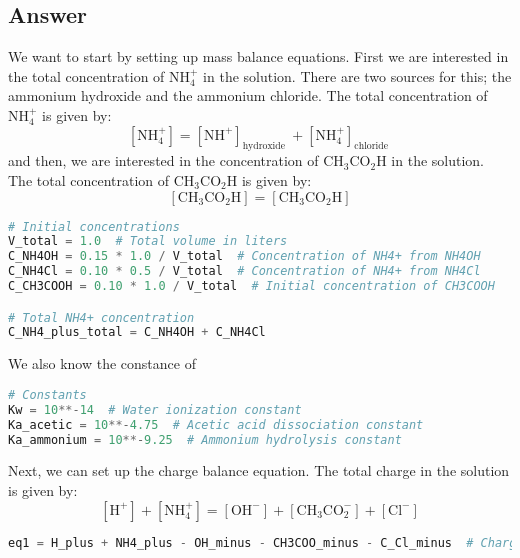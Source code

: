 \documentclass[12pt]{article}
\begin{document}
\subsection{Answer}
We want to start by setting up mass balance equations. First we are interested in the total concentration of $\mathrm{NH}_{4}^{+}$ in the solution. There are two sources for this; the ammonium hydroxide and the ammonium chloride. The total concentration of $\mathrm{NH}_{4}^{+}$ is given by:
\begin{equation}
  \left[\mathrm{NH}_{4}^{+}\right] = \left[\mathrm{NH}_{}^{+}\right]_{\text {hydroxide }} + \left[\mathrm{NH}_{4}^{+}\right]_{\text {chloride }}
\end{equation}
and then, we are interested in the concentration of $\mathrm{CH}_{3} \mathrm{CO}_{2} \mathrm{H}$ in the solution. The total concentration of $\mathrm{CH}_{3} \mathrm{CO}_{2} \mathrm{H}$ is given by:
\begin{equation}
  \left[\mathrm{CH}_{3} \mathrm{CO}_{2} \mathrm{H}\right] = \left[\mathrm{CH}_{3} \mathrm{CO}_{2} \mathrm{H}\right]
\end{equation}
\begin{lstlisting}[language=Python]
# Initial concentrations
V_total = 1.0  # Total volume in liters
C_NH4OH = 0.15 * 1.0 / V_total  # Concentration of NH4+ from NH4OH
C_NH4Cl = 0.10 * 0.5 / V_total  # Concentration of NH4+ from NH4Cl
C_CH3COOH = 0.10 * 1.0 / V_total  # Initial concentration of CH3COOH

# Total NH4+ concentration
C_NH4_plus_total = C_NH4OH + C_NH4Cl
\end{lstlisting}
We also know the constance of
\begin{lstlisting}[language=Python]
# Constants
Kw = 10**-14  # Water ionization constant
Ka_acetic = 10**-4.75  # Acetic acid dissociation constant
Ka_ammonium = 10**-9.25  # Ammonium hydrolysis constant
\end{lstlisting}
Next, we can set up the charge balance equation. The total charge in the solution is given by:
\begin{equation}
  \left[\mathrm{H}^{+}\right] + \left[\mathrm{NH}_{4}^{+}\right] = \left[\mathrm{OH}^{-}\right] + \left[\mathrm{CH}_{3} \mathrm{CO}_{2}^{-}\right] + \left[\mathrm{Cl}^{-}\right] 
\end{equation}
\begin{lstlisting}[language=Python]
eq1 = H_plus + NH4_plus - OH_minus - CH3COO_minus - C_Cl_minus  # Charge balance
\end{lstlisting}
\end{document}

